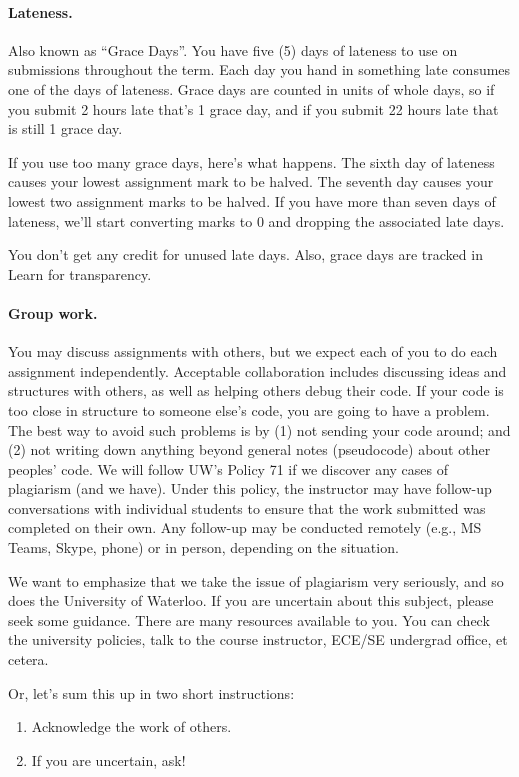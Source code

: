 \paragraph{Lateness.} Also known as ``Grace Days''. You have five (5) days of lateness to use on  submissions throughout the term. Each day you hand in something late consumes one of the days of lateness. Grace days are counted in units of whole days, so if you submit 2 hours late that's 1 grace day, and if you submit 22 hours late that is still 1 grace day. 

If you use too many grace days, here's what happens. The sixth day of lateness causes your lowest assignment mark to be halved. The seventh day causes your lowest two assignment marks to be halved. If you have more than seven days of lateness, we'll start converting marks to 0 and dropping the associated late days.

You don't get any credit for unused late days. Also, grace days are tracked in Learn for transparency.

\paragraph{Group work.} 
You may discuss assignments with others, but we expect each of you to
do each assignment independently. Acceptable collaboration includes
discussing ideas and structures with others, as well as helping others
debug their code. If your code is too close in structure to someone
else's code, you are going to have a problem. The best way to avoid
such problems is by (1) not sending your code around; and (2) not
writing down anything beyond general notes (pseudocode) about other
peoples' code. We will follow UW's Policy 71 if we discover any cases of
plagiarism (and we have). Under this policy, the instructor may have follow-up conversations with individual students to ensure that the work submitted was completed on their own. Any follow-up may be conducted remotely (e.g., MS Teams, Skype, phone) or in person, depending on the situation.

We want to emphasize that we take the issue of plagiarism very seriously, and so does the University of Waterloo. If you are uncertain about this subject, please seek some guidance. There are many resources available to you. You can check the university policies, talk to the course instructor, ECE/SE undergrad office, et cetera.

Or, let's sum this up in two short instructions:
\begin{enumerate}
	\item Acknowledge the work of others. 
	\item If you are uncertain, ask!
\end{enumerate}

